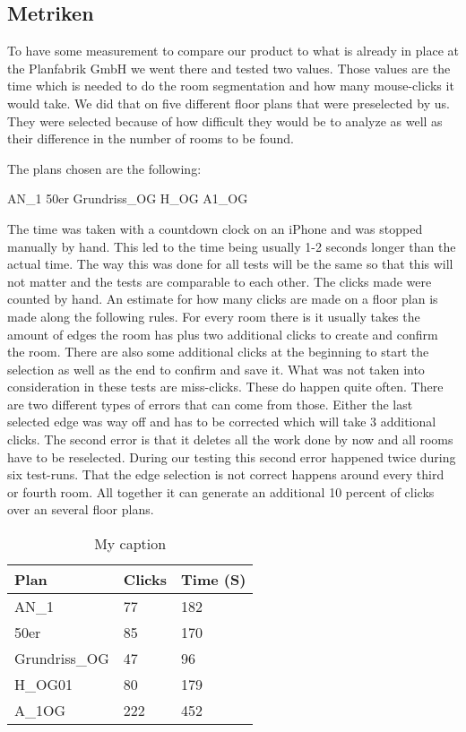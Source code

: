 \subsection{Metriken}
To have some measurement to compare our product to what is already in place at the Planfabrik GmbH we went there and tested two values. Those values are the time which is needed to do the room segmentation and how many mouse-clicks it would take. We did that on five different floor plans that were preselected by us. They were selected because of how difficult they would be to analyze as well as their difference in the number of rooms to be found.

The plans chosen are the following:

AN\_1
50er
Grundriss\_OG
H\_OG
A1\_OG

The time was taken with a countdown clock on an iPhone and was stopped manually by hand. This led to the time being usually 1-2 seconds longer than the actual time. The way this was done for all tests will be the same so that this will not matter and the tests are comparable to each other. The clicks made were counted by hand.
An estimate for how many clicks are made on a floor plan is made along the following rules. For every room there is it usually takes the amount of edges the room has plus two additional clicks to create and confirm the room. There are also some additional clicks at the beginning to start the selection as well as the end to confirm and save it.
What was not taken into consideration in these tests are miss-clicks. These do happen quite often. There are two different types of errors that can come from those. Either the last selected edge was way off and has to be corrected which will take 3 additional clicks. The second error is that it deletes all the work done by now and all rooms have to be reselected. During our testing this second error happened twice during six test-runs. That the edge selection is not correct happens around every third or fourth room. All together it can generate an additional 10 percent of clicks over an several floor plans.


\begin{table}[]
	\centering
	\caption{My caption}
	\label{my-label}
	\begin{tabular}{@{}lll@{}}
		\toprule
		Plan          & Clicks & Time (S) \\ \midrule
		AN\_1         & 77     & 182 \\
		50er          & 85     & 170  \\
		Grundriss\_OG & 47     & 96 \\
		H\_OG01         & 80     & 179 \\
		A\_1OG        & 222    & 452 \\ \bottomrule
	\end{tabular}
\end{table}

